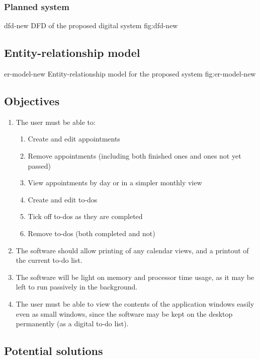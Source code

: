 \subsubsection{Planned system}

\addfigure
    {dfd-new}
    {DFD of the proposed digital system}
    {fig:dfd-new}


\subsection{Entity-relationship model}

\addfigure
    {er-model-new}
    {Entity-relationship model for the proposed system}
    {fig:er-model-new}


\subsection{Objectives}

\begin{enumerate}
    \item The user must be able to:
    \begin{enumerate}
        \item Create and edit appointments
        \item Remove appointments (including both finished ones and ones not yet
            passed)
        \item View appointments by day or in a simpler monthly view
        \item Create and edit to-dos
        \item Tick off to-dos as they are completed
        \item Remove to-dos (both completed and not)
    \end{enumerate}
    \item The software should allow printing of any calendar views, and a
        printout of the current to-do list.
    \item The software will be light on memory and processor time usage, as it
        may be left to run passively in the background.
    \item The user must be able to view the contents of the application
        windows easily even as small windows, since the software may be kept
        on the desktop permanently (as a digital to-do list).
\end{enumerate}


\subsection{Potential solutions}

